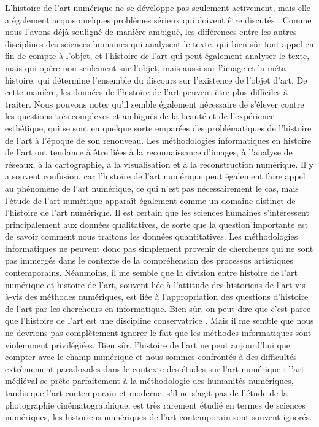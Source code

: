 \documentclass[a4paper, twoside, 12pt]{book}
\begin{document}
L'histoire de l'art numérique ne se développe pas seulement activement, mais elle a également acquis quelques problèmes sérieux qui doivent être discutés\cite{Wasielewski, A. (2021). The growing pains of digital art history : Issues for the study of art using computational methods. Digital Human Sciences : New Objects - New Approaches, 127-151. https://doi.org/10.16993/bbk.f} . Comme nous l'avons déjà souligné de manière ambiguë, les différences entre les autres disciplines des sciences humaines qui analysent le texte, qui bien sûr font appel en fin de compte à l'objet, et l'histoire de l'art qui peut également analyser le texte, mais qui opère non seulement sur l'objet, mais aussi sur l'image et la méta-histoire, qui détermine l'ensemble du discours sur l'existence de l'objet d'art. De cette manière, les données de l'histoire de l'art peuvent être plus difficiles à traiter. Nous pouvons noter qu'il semble également nécessaire de s'élever contre les questions très complexes et ambiguës de la beauté et de l'expérience esthétique, qui se sont en quelque sorte emparées des problématiques de l'histoire de l'art à l'époque de son renouveau. Les méthodologies informatiques en histoire de l'art ont tendance à être liées à la reconnaissance d'images, à l'analyse de réseaux, à la cartographie, à la visualisation et à la reconstruction numérique. Il y a souvent confusion, car l'histoire de l'art numérique peut également faire appel au phénomène de l'art numérique, ce qui n'est pas nécessairement le cas, mais l'étude de l'art numérique apparaît également comme un domaine distinct de l'histoire de l'art numérique. Il est certain que les sciences humaines s'intéressent principalement aux données qualitatives, de sorte que la question importante est de savoir comment nous traitons les données quantitatives. Les méthodologies informatiques ne peuvent donc pas simplement provenir de chercheurs qui ne sont pas immergés dans le contexte de la compréhension des processus artistiques contemporains. Néanmoins, il me semble que la division entre histoire de l'art numérique et histoire de l'art, souvent liée à l'attitude des historiens de l'art vis-à-vis des méthodes numériques, est liée à l'appropriation des questions d'histoire de l'art par les chercheurs en informatique. Bien sûr, on peut dire que c'est parce que l'histoire de l'art est une discipline conservatrice\cite{ Wasielewski, A. (2021). The growing pains of digital art history : Issues for the study of art using computational methods. Digital Human Sciences : New Objects - New Approaches, 127-151. https://doi.org/10.16993/bbk.f} . Mais il me semble que nous ne devrions pas complètement ignorer le fait que les méthodes informatiques sont violemment privilégiées. Bien sûr, l'histoire de l'art ne peut aujourd'hui que compter avec le champ numérique et nous sommes confrontés à des difficultés extrêmement paradoxales dans le contexte des études sur l'art numérique : l'art médiéval se prête parfaitement à la méthodologie des humanités numériques, tandis que l'art contemporain et moderne, s'il ne s'agit pas de l'étude de la photographie cinématographique, est très rarement étudié en termes de sciences numériques, les historiens numériques de l'art contemporain sont souvent ignorés.\\
\end{document}
